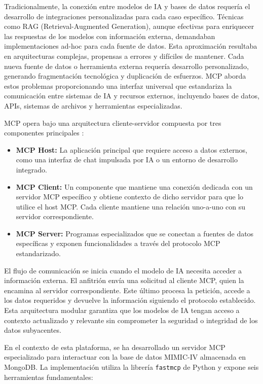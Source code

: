 Tradicionalmente, la conexión entre modelos de IA y bases de datos requería el desarrollo de integraciones personalizadas para cada caso específico. Técnicas como RAG (Retrieval-Augmented Generation), aunque efectivas para enriquecer las respuestas de los modelos con información externa, demandaban implementaciones ad-hoc para cada fuente de datos. Esta aproximación resultaba en arquitecturas complejas, propensas a errores y difíciles de mantener. Cada nueva fuente de datos o herramienta externa requería desarrollo personalizado, generando fragmentación tecnológica y duplicación de esfuerzos. MCP aborda estos problemas proporcionando una interfaz universal que estandariza la comunicación entre sistemas de IA y recursos externos, incluyendo bases de datos, APIs, sistemas de archivos y herramientas especializadas.


MCP opera bajo una arquitectura cliente-servidor compuesta por tres componentes principales \cite{mcp_arch}:

\begin{itemize}
\item \textbf{MCP Host:} La aplicación principal que requiere acceso a datos externos, como una interfaz de chat impulsada por IA o un entorno de desarrollo integrado.
\item \textbf{MCP Client:} Un componente que mantiene una conexión dedicada con un servidor MCP específico y obtiene contexto de dicho servidor para que lo utilice el host MCP. Cada cliente mantiene una relación uno-a-uno con su servidor correspondiente.
\item \textbf{MCP Server:} Programas especializados que se conectan a fuentes de datos específicas y exponen funcionalidades a través del protocolo MCP estandarizado.
\end{itemize}

El flujo de comunicación se inicia cuando el modelo de IA necesita acceder a información externa. El anfitrión envía una solicitud al cliente MCP, quien la encamina al servidor correspondiente. Este último procesa la petición, accede a los datos requeridos y devuelve la información siguiendo el protocolo establecido. Esta arquitectura modular garantiza que los modelos de IA tengan acceso a contexto actualizado y relevante sin comprometer la seguridad o integridad de los datos subyacentes.

En el contexto de esta plataforma, se ha desarrollado un servidor MCP especializado para interactuar con la base de datos MIMIC-IV almacenada en MongoDB. La implementación utiliza la librería \texttt{fastmcp} de Python y expone seis herramientas fundamentales:

